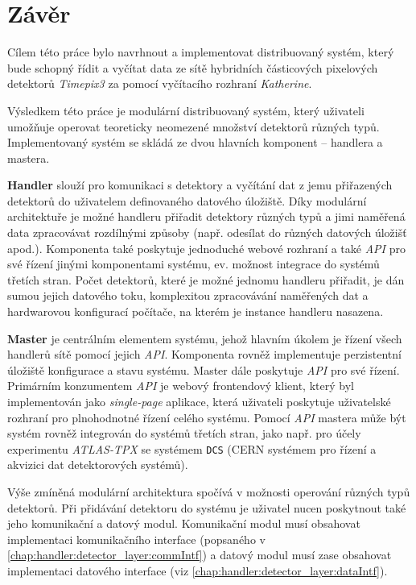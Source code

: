 

\chapter{Závěr}\label{chap:zaver}
Cílem této práce bylo navrhnout a implementovat distribuovaný systém, který bude schopný řídit a vyčítat data ze sítě hybridních částicových pixelových detektorů \textit{Timepix3} za pomocí vyčítacího rozhraní \textit{Katherine}. 

Výsledkem této práce je modulární distribuovaný systém, který uživateli umožňuje operovat teoreticky neomezené množství detektorů různých typů. Implementovaný systém se skládá ze dvou hlavních komponent -- handlera a mastera.

\textbf{Handler} slouží pro komunikaci s detektory a vyčítání dat z jemu přiřazených detektorů do uživatelem definovaného datového úložiště. Díky modulární architektuře je možné handleru přiřadit detektory různých typů a jimi naměřená data zpracovávat rozdílnými způsoby (např. odesílat do různých datových úložišť apod.). Komponenta také poskytuje jednoduché webové rozhraní a také \textit{API} pro své řízení jinými komponentami systému, ev. možnost integrace do systémů třetích stran. Počet detektorů, které je možné jednomu handleru přiřadit, je dán sumou jejich datového toku, komplexitou zpracovávání naměřených dat a hardwarovou konfigurací počítače, na kterém je instance handleru nasazena.

\textbf{Master} je centrálním elementem systému, jehož hlavním úkolem je řízení všech handlerů sítě pomocí jejich \textit{API}. Komponenta rovněž implementuje perzistentní úložiště konfigurace a stavu systému. Master dále poskytuje \textit{API} pro své řízení. Primárním konzumentem \textit{API} je webový frontendový klient, který byl implementován jako \textit{single-page} aplikace, která uživateli poskytuje uživatelské rozhraní pro plnohodnotné řízení celého systému. Pomocí \textit{API} mastera může být systém rovněž integrován do systémů třetích stran, jako např. pro účely experimentu \textit{ATLAS-TPX} se systémem \texttt{DCS} (CERN systémem pro řízení a akvizici dat detektorových systémů).

Výše zmíněná modulární architektura spočívá v možnosti operování různých typů detektorů. Při přidávání detektoru do systému je uživatel nucen poskytnout také jeho komunikační a datový modul. Komunikační modul musí obsahovat implementaci komunikačního interface (popsaného v \ref{chap:handler:detector_layer:commIntf}) a datový modul musí zase obsahovat implementaci datového interface (viz \ref{chap:handler:detector_layer:dataIntf}).

